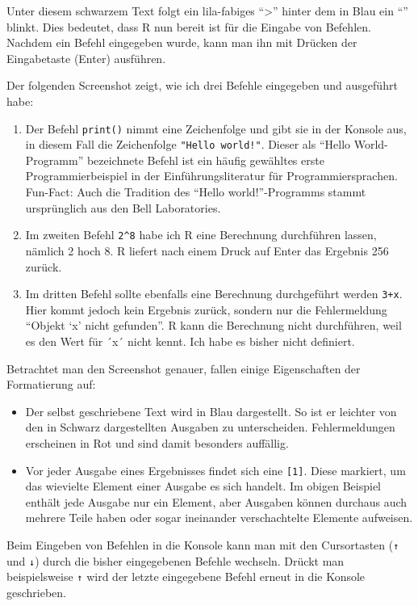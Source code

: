 \documentclass[
]{book}
\begin{document}
Unter diesem schwarzem Text folgt ein lila-fabiges ``\textgreater{}'' hinter dem in Blau ein ``\textbar{}'' blinkt.
Dies bedeutet, dass R nun bereit ist für die Eingabe von Befehlen. Nachdem ein Befehl eingegeben wurde, kann man ihn mit Drücken der Eingabetaste (Enter) ausführen.

Der folgenden Screenshot zeigt, wie ich drei Befehle eingegeben und ausgeführt habe:

\begin{enumerate}
\def\labelenumi{\arabic{enumi}.}
\item
  Der Befehl \texttt{print()} nimmt eine Zeichenfolge und gibt sie in der Konsole aus, in diesem Fall die Zeichenfolge \texttt{"Hello\ world!"}.
  Dieser als ``Hello World-Programm'' bezeichnete Befehl ist ein häufig gewähltes erste Programmierbeispiel in der Einführungsliteratur für Programmiersprachen. Fun-Fact: Auch die Tradition des ``Hello world!''-Programms stammt ursprünglich aus den Bell Laboratories.
\item
  Im zweiten Befehl \texttt{2\^{}8} habe ich R eine Berechnung durchführen lassen, nämlich 2 hoch 8.
  R liefert nach einem Druck auf Enter das Ergebnis 256 zurück.
\item
  Im dritten Befehl sollte ebenfalls eine Berechnung durchgeführt werden \texttt{3+x}.
  Hier kommt jedoch kein Ergebnis zurück, sondern nur die Fehlermeldung ``Objekt `x' nicht gefunden''.
  R kann die Berechnung nicht durchführen, weil es den Wert für ´x´ nicht kennt.
  Ich habe es bisher nicht definiert.
\end{enumerate}

Betrachtet man den Screenshot genauer, fallen einige Eigenschaften der Formatierung auf:

\begin{itemize}
\item
  Der selbst geschriebene Text wird in Blau dargestellt. So ist er leichter von den in Schwarz dargestellten Ausgaben zu unterscheiden. Fehlermeldungen erscheinen in Rot und sind damit besonders auffällig.
\item
  Vor jeder Ausgabe eines Ergebnisses findet sich eine \texttt{{[}1{]}}. Diese markiert, um das wievielte Element einer Ausgabe es sich handelt.
  Im obigen Beispiel enthält jede Ausgabe nur ein Element, aber Ausgaben können durchaus auch mehrere Teile haben oder sogar ineinander verschachtelte Elemente aufweisen.
\end{itemize}

Beim Eingeben von Befehlen in die Konsole kann man mit den Cursortasten (\texttt{↑} und \texttt{↓}) durch die bisher eingegebenen Befehle wechseln. Drückt man beispielsweise \texttt{↑} wird der letzte eingegebene Befehl erneut in die Konsole geschrieben.
\end{document}
